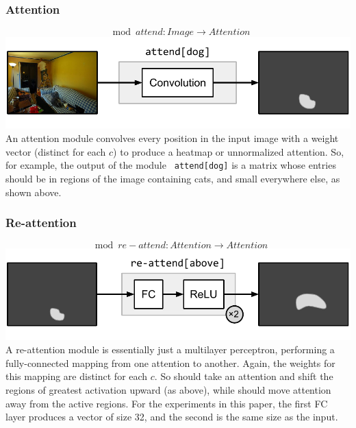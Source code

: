 \pagebreak
\subsubsection*{Attention}
\[
  \mod{attend} : \mathit{Image} \to \mathit{Attention}
\]
\includegraphics[width=\columnwidth]{fig/attend}
An attention module  convolves every position in the input
image with a weight vector (distinct for each $c$) to produce a heatmap or
unnormalized attention. So, for example, the output of the module {\small\tt
attend[dog]} is a matrix whose entries should be in regions of the image
containing cats, and small everywhere else, as shown above.\\

\subsubsection*{Re-attention}
\[
  \mod{re-attend} : \mathit{Attention} \to \mathit{Attention}
\]
\includegraphics[width=\columnwidth]{fig/re-attend}
A re-attention module  is essentially just a multilayer
perceptron, performing a fully-connected mapping from one attention to another.
Again, the weights for this mapping are distinct for each $c$. So
 should take an attention and shift the regions of
greatest activation upward (as above), while  should move
attention away from the active regions. For the experiments in this paper, the
first FC layer produces a vector of size 32, and the second is the same size as
the input. \\%

